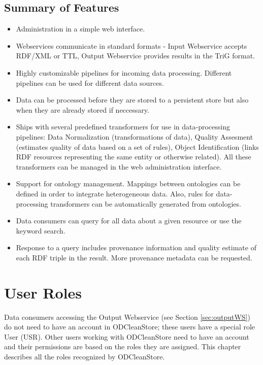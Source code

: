\section{Summary of Features}

\begin{itemize}
  \item Administration in a simple web interface.
  \item Webservices communicate in standard formats - Input Webservice accepts RDF/XML or TTL, Output Webservice provides results in the TriG format. 
  \item Highly customizable pipelines for incoming data processing. Different pipelines can be used for different data sources.
  \item Data can be processed before they are stored to a persistent store but also when they are already stored if neccessary.
  \item Ships with several predefined transformers for use in data-processing pipelines: Data Normalization (transformations of data), Quality Assesment (estimates quality of data based on a set of rules), Object Identification (links RDF resources representing the same entity or otherwise related). All these transformers can be managed in the web administration interface.
  \item Support for ontology management. Mappings between ontologies can be defined in order to integrate heterogeneous data. Also, rules for data-processing transformers can be automatically generated from ontologies.
  \item Data consumers can query for all data about a given resource or use the keyword search.
  \item Response to a query includes provenance information and quality estimate of each RDF triple in the result. More provenance metadata can be requested.
\end{itemize}



\chapter{User Roles}
\label{chap:userRoles}


Data consumers accessing the Output Webservice (see Section \ref{sec:outputWS}) do not need to have an account in ODCleanStore; these users have a special role User (USR). Other users working with ODCleanStore need to have an account and their permissions are based on the roles they are assigned. This chapter describes all the roles recognized by ODCleanStore.


